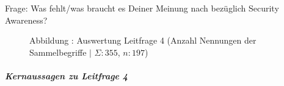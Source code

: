 \documentclass[../../main.tex]{subfiles}
\begin{document}
\begin{sloppypar}
Frage: Was fehlt/was braucht es Deiner Meinung nach bezüglich Security Awareness?
\end{sloppypar}

\addtocounter{figure}{1}\begin{figure}[H]
    
    \vspace*{-5mm}
    \caption*{Abbildung \thefigure: Auswertung Leitfrage 4 (Anzahl Nennungen der Sammelbegriffe $\vert$ $\Sigma: 355$, $n: 197$)}
    \label{pgfplot_leitfrage4}
\end{figure}

\subparagraph*{Kernaussagen zu Leitfrage 4}\mbox{}

\end{document}
